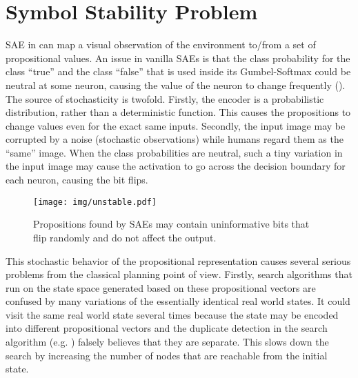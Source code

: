 
\section{Symbol Stability Problem}
\label{issues}

SAE in \latentplanner can map a visual observation of the environment to/from a set of propositional values.
An issue in vanilla SAEs is that the class probability for the class ``true'' and the class ``false''
that is used inside its Gumbel-Softmax could be neutral at some neuron,
causing the value of the neuron to change frequently ().
The source of stochasticity is twofold.
Firstly, the encoder is a probabilistic distribution, rather than a deterministic function.
This causes the propositions to change values even for the exact same inputs.
Secondly, the input image may be corrupted by a noise (stochastic observations)
while humans regard them as the ``same'' image.
When the class probabilities are neutral,
such a tiny variation in the input image may cause the activation to go across the decision boundary for each neuron,
causing the bit flips.

\begin{figure}[tb]
 \centering
 \texttt{[image: img/unstable.pdf]}
 \caption{Propositions found by SAEs may contain uninformative bits
 that flip randomly and do not affect the output.}
 \label{unstable}
\end{figure}

This stochastic behavior of the propositional representation
causes several serious problems from the classical planning point of view.
% 
Firstly, search algorithms that run on the state space generated based on these propositional vectors
are confused by many variations of the essentially identical real world states.
It could visit the same real world state several times because
the state may be encoded into different propositional vectors
and the duplicate detection in the search algorithm (e.g. \astar) falsely believes that they are separate.
This slows down the search by increasing the number of nodes that are reachable from the initial state.

